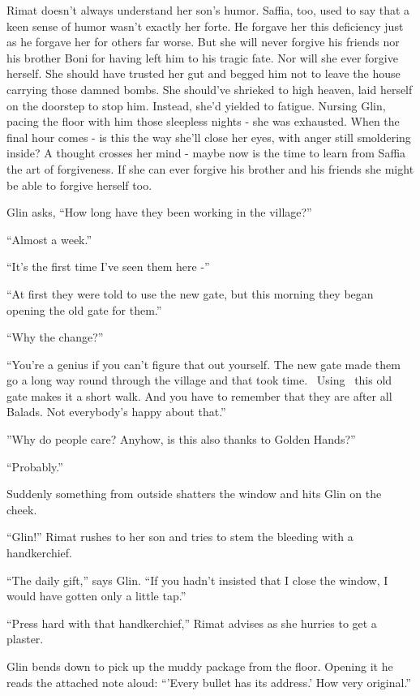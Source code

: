 \documentclass[twoside,11pt]{book}
\begin{document}
Rimat doesn't always understand her son's humor. Saffia, too, used to
say that a keen sense of humor wasn't exactly her forte. He forgave
her this deficiency just as he forgave her for others far worse. But
she will never forgive his friends nor his brother Boni for having
left him to his tragic fate.  Nor will she ever forgive herself.  She
should have trusted her gut and begged him not to leave the house
carrying those damned bombs. She should've shrieked to high heaven,
laid herself on the doorstep to stop him. Instead, she'd yielded to
fatigue. Nursing Glin, pacing the floor with him those sleepless
nights - she was exhausted. When the final hour comes - is this the
way she'll close her eyes, with anger still smoldering inside? A
thought crosses her mind - maybe now is the time to learn from Saffia
the art of forgiveness. If she can ever forgive his brother and his
friends she might be able to forgive herself too.

Glin asks, ``How long have they been working in the village?''

``Almost a week.''

``It's the first time I've seen them here -''

``At first they were told to use the new gate, but this morning they
began opening the old gate for them.''

``Why
the change?''

``You're a genius if you can't figure that out yourself. The new gate made them go a long way round
through the village and that took time. \ Using \ this old gate makes it a short walk. And you have to remember that
they are after all Balads. Not everybody's happy about that.''

''Why do people care? Anyhow, is this also
thanks to Golden
Hands?''

``Probably.''

Suddenly something from outside shatters the window and hits Glin on
the cheek.

``Glin!'' Rimat rushes to her son and tries to stem the bleeding
with a handkerchief.

``The daily gift,'' says Glin. ``If you hadn't insisted that
I close the window, I would have gotten only a little
tap.''

``Press hard with that
handkerchief,'' Rimat advises as she hurries to get
a plaster.

Glin bends down to pick up the muddy
package from the floor. Opening it he reads the attached note aloud:
``'Every bullet has its address.' How very
original.''
\end{document}
